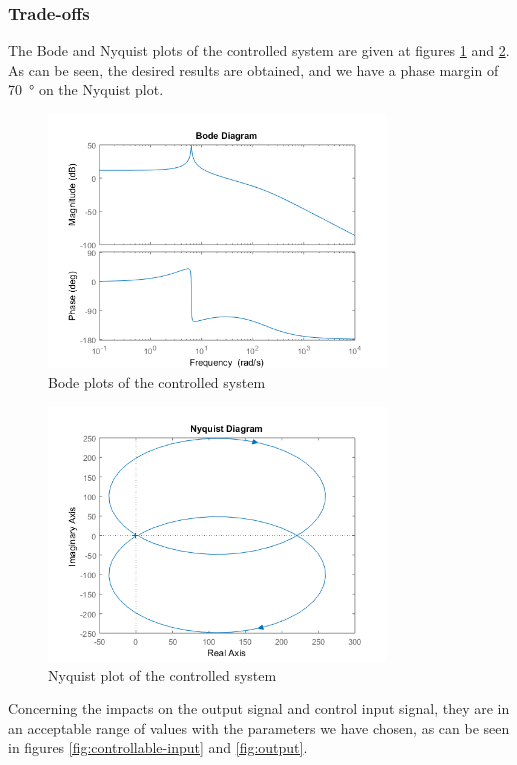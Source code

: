 \subsubsection{Trade-offs}
The Bode and Nyquist plots of the controlled system are given at figures \ref{fig:bode-control} and \ref{fig:nyquist-control}. As can be seen, the desired results are obtained, and we have a phase margin of \SI{70}{\degree} on the Nyquist plot.
\begin{figure}[H]
    \centering
    \includegraphics[width=0.8\textwidth]{resources/png/bode-control.png}
    \caption{Bode plots of the controlled system}
    \label{fig:bode-control}
\end{figure}
\begin{figure}[H]
    \centering
    \includegraphics[width=0.8\textwidth]{resources/png/nyquist-control.png}
    \caption{Nyquist plot of the controlled system}
    \label{fig:nyquist-control}
\end{figure}
Concerning the impacts on the output signal and control input signal, they are in an acceptable range of values with the parameters we have chosen, as can be seen in figures \ref{fig:controllable-input} and \ref{fig:output}.
